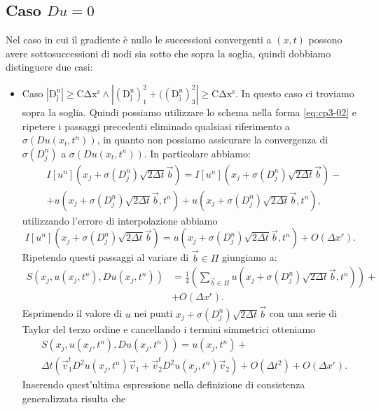 \subsection{Caso $Du = 0$}

Nel caso in cui il gradiente è nullo le successioni convergenti a $(x,t)$ possono avere sottosuccessioni di nodi sia sotto che sopra la soglia, quindi dobbiamo distinguere due casi:
\begin{itemize}
  \item \textsf{Caso} $\mathrm{|D_j^n|\ge C\Delta x^s\land|(D_j^n)_1^2+((D_j^n)_3^2|\ge C\Delta x^s}$. In questo caso ci troviamo sopra la soglia. Quindi possiamo utilizzare lo schema nella forma \eqref{eq:cp3-02} e ripetere i passaggi precedenti eliminado qualsiasi riferimento a $\sigma(Du(x_t,t^n))$, in quanto non possiamo assicurare la convergenza di $\sigma(D_j^n)$ a $\sigma(Du(x_t,t^n))$. In particolare abbiamo:
\[
  \begin{split}
    & I[u^n](x_j+\sigma(D_j^n)\sqrt{2\Delta t}\vec{b}) = I[u^n](x_j+\sigma(D_j^n)\sqrt{2\Delta t}\vec{b}) - \\
    & +u(x_j+\sigma(D_j^n)\sqrt{2\Delta t}\vec{b},t^n) + u(x_j+\sigma(D_j^n)\sqrt{2\Delta t}\vec{b},t^n),
  \end{split}
\]
utilizzando l'errore di interpolazione abbiamo
\[
I[u^n](x_j+\sigma(D_j^n)\sqrt{2\Delta t}\vec{b})=u(x_j+\sigma(D_j^n)\sqrt{2\Delta t}\vec{b},t^n) + O(\Delta x^r).
\]
Ripetendo questi passaggi al variare di $\vec{b}\in\Pi$ giungiamo a:
\[
 \begin{split}
 S(x_j,u(x_j,t^n),Du(x_j,t^n))&=\frac{1}{4}\left(\sum_{\vec{b}\in\Pi}u(x_j+\sigma(D_j^n)\sqrt{2\Delta t}\vec{b},t^n)\right)+\\
  &+ O(\Delta x^r).
 \end{split}
\]
Esprimendo il valore di $u$ nei punti $x_j+\sigma(D_j^n)\sqrt{2\Delta t}\vec{b}$ con una serie di Taylor del terzo ordine e cancellando i termini simmetrici otteniamo
\begin{equation}
  \label{eq:cp3-11}
  \begin{split}
    &S(x_j,u(x_j,t^n),Du(x_j,t^n)) = u(x_j,t^n) + \\
    &\Delta t\left(\vec{v}_1^tD^2u(x_j,t^n)\vec{v}_1 + \vec{v}_2^tD^2u(x_j,t^n)\vec{v}_2\right) + O(\Delta t^2) + O(\Delta x^r).
   \end{split}
\end{equation}
Inserendo quest'ultima espressione nella definizione di consistenza generalizzata risulta che
\[
\begin{split}

\end{split}\]
\end{itemize}
